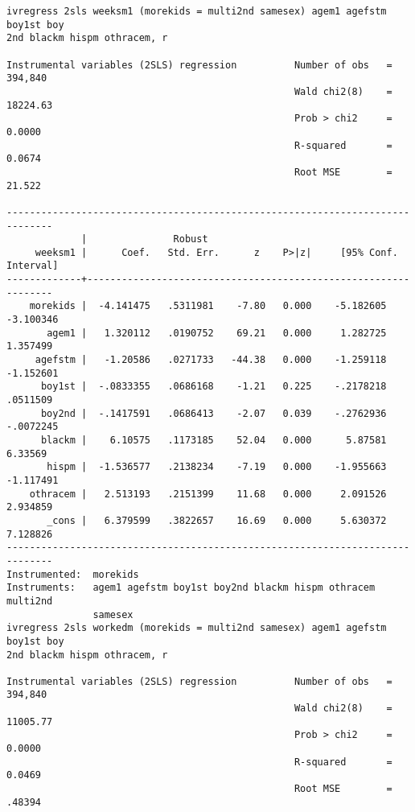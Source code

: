 \documentclass[cache=false]{article}
\begin{document}
\begin{verbatim}
ivregress 2sls weeksm1 (morekids = multi2nd samesex) agem1 agefstm boy1st boy
2nd blackm hispm othracem, r

Instrumental variables (2SLS) regression          Number of obs   =    394,840
                                                  Wald chi2(8)    =   18224.63
                                                  Prob > chi2     =     0.0000
                                                  R-squared       =     0.0674
                                                  Root MSE        =     21.522

------------------------------------------------------------------------------
             |               Robust
     weeksm1 |      Coef.   Std. Err.      z    P>|z|     [95% Conf. Interval]
-------------+----------------------------------------------------------------
    morekids |  -4.141475   .5311981    -7.80   0.000    -5.182605   -3.100346
       agem1 |   1.320112   .0190752    69.21   0.000     1.282725    1.357499
     agefstm |   -1.20586   .0271733   -44.38   0.000    -1.259118   -1.152601
      boy1st |  -.0833355   .0686168    -1.21   0.225    -.2178218    .0511509
      boy2nd |  -.1417591   .0686413    -2.07   0.039    -.2762936   -.0072245
      blackm |    6.10575   .1173185    52.04   0.000      5.87581     6.33569
       hispm |  -1.536577   .2138234    -7.19   0.000    -1.955663   -1.117491
    othracem |   2.513193   .2151399    11.68   0.000     2.091526    2.934859
       _cons |   6.379599   .3822657    16.69   0.000     5.630372    7.128826
------------------------------------------------------------------------------
Instrumented:  morekids
Instruments:   agem1 agefstm boy1st boy2nd blackm hispm othracem multi2nd
               samesex
ivregress 2sls workedm (morekids = multi2nd samesex) agem1 agefstm boy1st boy
2nd blackm hispm othracem, r

Instrumental variables (2SLS) regression          Number of obs   =    394,840
                                                  Wald chi2(8)    =   11005.77
                                                  Prob > chi2     =     0.0000
                                                  R-squared       =     0.0469
                                                  Root MSE        =     .48394


\end{verbatim}
\end{document}
